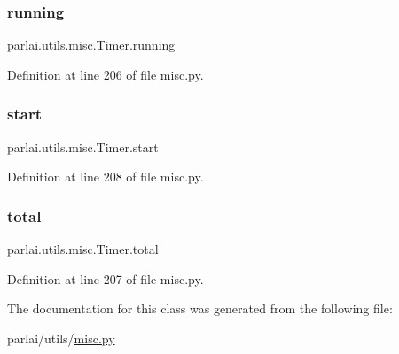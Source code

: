 \subsubsection{\texorpdfstring{running}{running}}
{\footnotesize\ttfamily parlai.\+utils.\+misc.\+Timer.\+running}



Definition at line 206 of file misc.\+py.

\mbox{\label{classparlai_1_1utils_1_1misc_1_1Timer_a1c32e2a8785377c980bc4b125fe6db0d}} 
\subsubsection{\texorpdfstring{start}{start}}
{\footnotesize\ttfamily parlai.\+utils.\+misc.\+Timer.\+start}



Definition at line 208 of file misc.\+py.

\mbox{\label{classparlai_1_1utils_1_1misc_1_1Timer_a37214900a663640b33bdce9e6b3053dd}} 
\subsubsection{\texorpdfstring{total}{total}}
{\footnotesize\ttfamily parlai.\+utils.\+misc.\+Timer.\+total}



Definition at line 207 of file misc.\+py.



The documentation for this class was generated from the following file\+:\begin{DoxyCompactItemize}
\item 
parlai/utils/\hyperlink{misc_8py}{misc.\+py}\end{DoxyCompactItemize}
